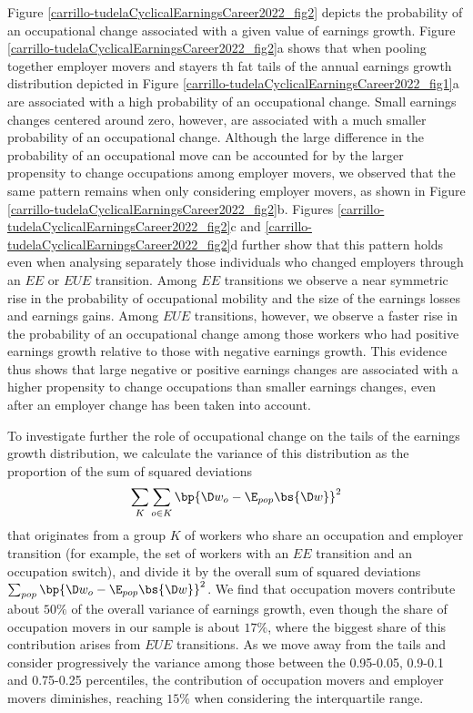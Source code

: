 \documentclass[12pt]{article}
\theoremstyle{definition}
\begin{document}
Figure \ref{carrillo-tudelaCyclicalEarningsCareer2022_fig2} depicts the probability of an occupational change associated with a given value of earnings growth. Figure \ref{carrillo-tudelaCyclicalEarningsCareer2022_fig2}a shows that when pooling together employer movers and stayers th fat tails of the annual earnings growth distribution depicted in Figure \ref{carrillo-tudelaCyclicalEarningsCareer2022_fig1}a are associated with a high probability of an occupational change. Small earnings changes centered around zero, however, are associated with a much smaller probability of an occupational change. Although the large difference in the probability of an occupational move can be accounted for by the larger propensity to change occupations among employer movers, we observed that the same pattern remains when only considering employer movers, as shown in Figure \ref{carrillo-tudelaCyclicalEarningsCareer2022_fig2}b. Figures \ref{carrillo-tudelaCyclicalEarningsCareer2022_fig2}c and \ref{carrillo-tudelaCyclicalEarningsCareer2022_fig2}d further show that this pattern holds even when analysing separately those individuals who changed employers through an $EE$ or $EUE$ transition. Among $EE$ transitions we observe a near symmetric rise in the probability of occupational mobility and the size of the earnings losses and earnings gains. Among $EUE$ transitions, however, we observe a faster rise in the probability of an occupational change among those workers who had positive earnings growth relative to those with negative earnings growth. This evidence thus shows that large negative or positive earnings changes are associated with a higher propensity to change occupations than smaller earnings changes, even after an employer change has been taken into account.

To investigate further the role of occupational change on the tails of the earnings growth distribution, we calculate the variance of this distribution as the proportion of the sum of squared deviations 
$$
\sum_{K} \sum_{o \in K} \bp{\D w_{o} - \E_{pop}\bs{\D w}}^2
$$
that originates from a group $K$ of workers who share an occupation and employer transition (for example, the set of workers with an $EE$ transition and an occupation switch), and divide it by the overall sum of squared deviations $\sum_{pop} \bp{\D w_{o} - \E_{pop}\bs{\D w}}^2$. We find that occupation movers contribute about $50\%$ of the overall variance of earnings growth, even though the share of occupation movers in our sample is about $17\%$, where the biggest share of this contribution arises from $EUE$ transitions. As we move away from the tails and consider progressively the variance among those between the 0.95-0.05, 0.9-0.1 and 0.75-0.25 percentiles, the contribution of occupation movers and employer movers diminishes, reaching $15\%$ when considering the interquartile range.
\end{document}
